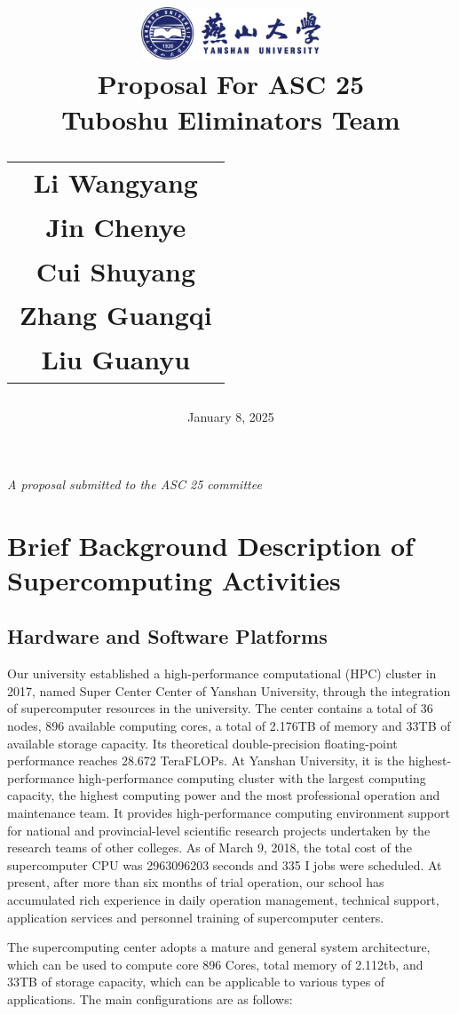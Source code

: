 \documentclass[a4paper,12pt]{article}
\title{
    \includegraphics[width=0.4\textwidth]{ysu-logo.png}\\[1cm] %
    {\LARGE Proposal For ASC 25}\\[0.5cm]
    \large Tuboshu Eliminators Team\\[1cm] %
        \begin{tabular}{c}
        \large Li Wangyang \\
        \large Jin Chenye \\
        \large Cui Shuyang \\
        \large Zhang Guangqi \\
        \large Liu Guanyu
    \end{tabular}
}
\author{}
\date{\vfill January 8, 2025}
\begin{document}
\maketitle
\thispagestyle{empty}
\vfill
\begin{center}
    \textit{A proposal submitted to the ASC 25 committee}
\end{center}
\newpage

\tableofcontents
{}
\newpage

\section{Brief Background Description of Supercomputing Activities}

\subsection{Hardware and Software Platforms}

Our university established a high-performance computational (HPC) cluster in 2017, named Super Center Center of Yanshan University, through the integration of supercomputer resources in the university. The center contains a total of 36 nodes, 896 available computing cores, a total of 2.176TB of memory and 33TB of available storage capacity. Its theoretical double-precision floating-point performance reaches 28.672 TeraFLOPs. At Yanshan University, it is the highest-performance high-performance computing cluster with the largest computing capacity, the highest computing power and the most professional operation and maintenance team. It provides high-performance computing environment support for national and provincial-level scientific research projects undertaken by the research teams of other colleges. As of March 9, 2018, the total cost of the supercomputer CPU was 2963096203 seconds and 335 I jobs were scheduled. At present, after more than six months of trial operation, our school has accumulated rich experience in daily operation management, technical support, application services and personnel training of supercomputer centers.

The supercomputing center adopts a mature and general system architecture, which can be used to compute core 896 Cores, total memory of 2.112tb, and 33TB of storage capacity, which can be applicable to various types of applications. The main configurations are as follows:
\end{document}
